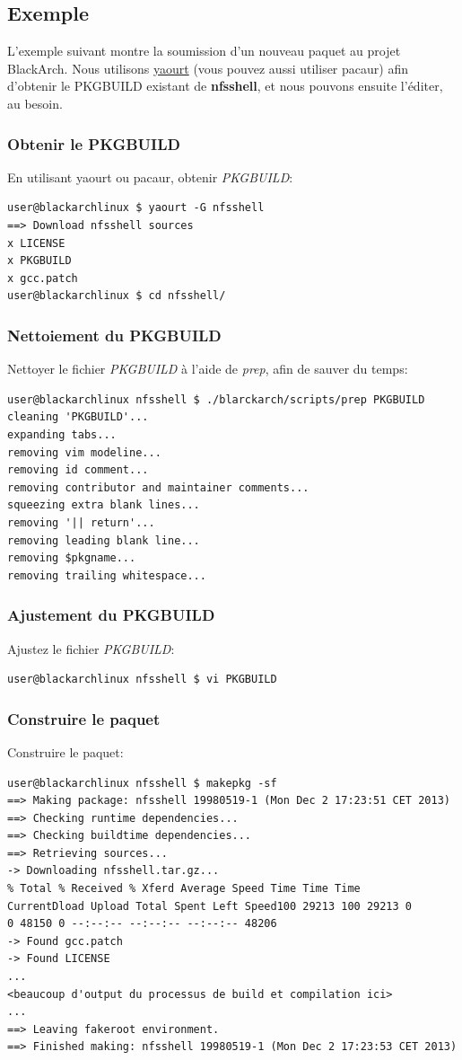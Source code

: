 \documentclass[a4paper, oneside, 11pt]{book}
\begin{document}
\subsection{Exemple}
L'exemple suivant montre la soumission d'un nouveau paquet au projet
BlackArch. Nous utilisons \href{https://wiki.archlinux.org/index.php/yaourt}{yaourt}
(vous pouvez aussi utiliser pacaur) afin d'obtenir le PKGBUILD existant de
\textbf{nfsshell}, et nous pouvons ensuite l'éditer, au besoin.

\subsubsection{Obtenir le PKGBUILD}
En utilisant yaourt ou pacaur, obtenir \textit{PKGBUILD}:
{\small
\color{gray}
\begin{verbatim}
user@blackarchlinux $ yaourt -G nfsshell
==> Download nfsshell sources
x LICENSE
x PKGBUILD
x gcc.patch
user@blackarchlinux $ cd nfsshell/
\end{verbatim}
}

\subsubsection{Nettoiement du PKGBUILD}
Nettoyer le fichier \textit{PKGBUILD} à l'aide de \textit{prep}, afin de sauver
du temps:
{\small
\color{gray}
\begin{verbatim}
user@blackarchlinux nfsshell $ ./blarckarch/scripts/prep PKGBUILD
cleaning 'PKGBUILD'...
expanding tabs...
removing vim modeline...
removing id comment...
removing contributor and maintainer comments...
squeezing extra blank lines...
removing '|| return'...
removing leading blank line...
removing $pkgname...
removing trailing whitespace...
\end{verbatim}
}

\subsubsection{Ajustement du PKGBUILD}
Ajustez le fichier \textit{PKGBUILD}:
{\small
\color{gray}
\begin{verbatim}
user@blackarchlinux nfsshell $ vi PKGBUILD
\end{verbatim}
}

\subsubsection{Construire le paquet}
Construire le paquet:
{\small
\color{gray}
\begin{verbatim}
user@blackarchlinux nfsshell $ makepkg -sf
==> Making package: nfsshell 19980519-1 (Mon Dec 2 17:23:51 CET 2013)
==> Checking runtime dependencies...
==> Checking buildtime dependencies...
==> Retrieving sources...
-> Downloading nfsshell.tar.gz...
% Total % Received % Xferd Average Speed Time Time Time
CurrentDload Upload Total Spent Left Speed100 29213 100 29213 0
0 48150 0 --:--:-- --:--:-- --:--:-- 48206
-> Found gcc.patch
-> Found LICENSE
...
<beaucoup d'output du processus de build et compilation ici>
...
==> Leaving fakeroot environment.
==> Finished making: nfsshell 19980519-1 (Mon Dec 2 17:23:53 CET 2013)
\end{verbatim}
}
\end{document}
